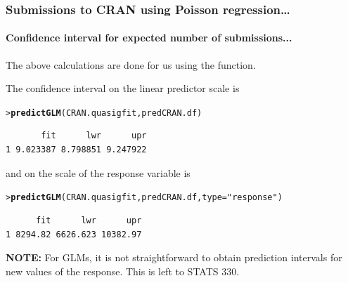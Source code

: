 \documentclass{beamer}\usepackage[]{graphicx}\usepackage[]{xcolor}
\makeatletter
\newcommand{\hlstr}[1]{\textcolor[rgb]{0.192,0.494,0.8}{#1}}%
\newcommand{\hlstd}[1]{\textcolor[rgb]{0.345,0.345,0.345}{#1}}%
\newcommand{\hlkwc}[1]{\textcolor[rgb]{0.333,0.667,0.333}{#1}}%
\newcommand{\hlkwd}[1]{\textcolor[rgb]{0.737,0.353,0.396}{\textbf{#1}}}%
\newenvironment{kframe}{%
 \def\at@end@of@kframe{}%
 \ifinner\ifhmode%
  \def\at@end@of@kframe{\end{minipage}}%
  \begin{minipage}{\columnwidth}%
 \fi\fi%
 \def\FrameCommand##1{\hskip\@totalleftmargin \hskip-\fboxsep
 \colorbox{shadecolor}{##1}\hskip-\fboxsep
     \hskip-\linewidth \hskip-\@totalleftmargin \hskip\columnwidth}%
 \MakeFramed {\advance\hsize-\width
   \@totalleftmargin\z@ \linewidth\hsize
   \@setminipage}}%
 {\par\unskip\endMakeFramed%
 \at@end@of@kframe}
\newenvironment{knitrout}{}{} %
\makeatother
\begin{document}
\begin{frame}[fragile]
\frametitle{Submissions to CRAN using Poisson regression\ldots}
\framesubtitle{Confidence interval for expected number of submissions...}

The above calculations are done for us using the  function.
\bigskip

The confidence interval on the linear predictor scale is

\begin{knitrout}\scriptsize
{}\color{fgcolor}\begin{kframe}
\begin{alltt}
\hlstd{> }\hlkwd{predictGLM}\hlstd{(CRAN.quasigfit, predCRAN.df)}
\end{alltt}


{\ttfamily\noindent\itshape\color{messagecolor}{***Estimates and CIs are on the link scale***}}\begin{verbatim}
       fit      lwr      upr
1 9.023387 8.798851 9.247922
\end{verbatim}
\end{kframe}
\end{knitrout}

and on the scale of the response variable is

\begin{knitrout}\scriptsize
{}\color{fgcolor}\begin{kframe}
\begin{alltt}
\hlstd{> }\hlkwd{predictGLM}\hlstd{(CRAN.quasigfit, predCRAN.df,}\hlkwc{type}\hlstd{=}\hlstr{"response"}\hlstd{)}
\end{alltt}


{\ttfamily\noindent\itshape\color{messagecolor}{***Estimates and CIs are on the response scale***}}\begin{verbatim}
      fit      lwr      upr
1 8294.82 6626.623 10382.97
\end{verbatim}
\end{kframe}
\end{knitrout}
\bigskip \bigskip
{\bf NOTE:} For GLMs, it is not straightforward to obtain prediction intervals for new values of the response. This is left to STATS 330.
\end{frame}



\end{document}
